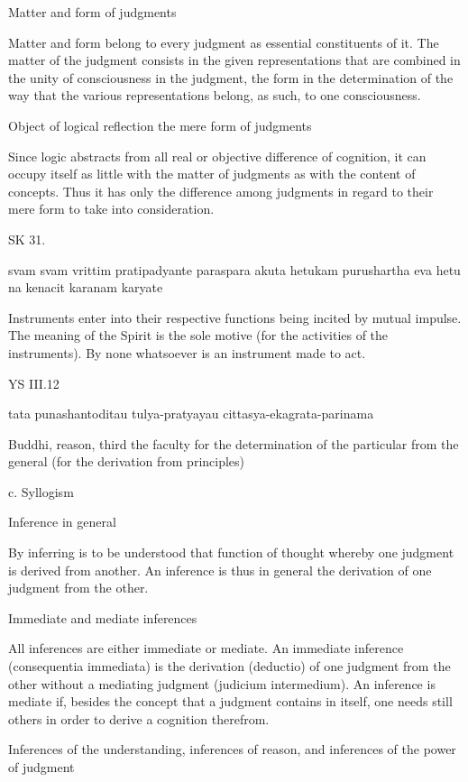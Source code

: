    Matter and form of judgments

        Matter and form belong to every judgment as essential constituents of it.
        The matter of the judgment consists in the given representations that are combined in
        the unity of consciousness in the judgment,
        the form in the determination of the way that the various representations belong, as such,
        to one consciousness.

    Object of logical reflection the mere form of judgments

        Since logic abstracts from all real or objective difference of cognition,
        it can occupy itself as little with the matter of judgments
        as with the content of concepts.
        Thus it has only the difference among judgments in regard to their mere form
        to take into consideration.

SK 31.

svam svam vrittim pratipadyante paraspara akuta hetukam
purushartha eva hetu na kenacit karanam karyate

Instruments enter into their respective functions being incited by mutual impulse.
The meaning of the Spirit is the sole motive (for the activities of the instruments).
By none whatsoever is an instrument made to act.

YS III.12

    tata punashantoditau tulya-pratyayau cittasya-ekagrata-parinama

    Buddhi, reason, third the faculty for the determination of
    the particular from the general (for the derivation from principles)

    c. Syllogism

    Inference in general

        By inferring is to be understood that function of thought whereby one judgment is derived from another.
        An inference is thus in general the derivation of one judgment from the other.

    Immediate and mediate inferences

        All inferences are either immediate or mediate.
        An immediate inference (consequentia immediata) is the derivation (deductio) of
        one judgment from the other without a mediating judgment (judicium intermedium).
        An inference is mediate if, besides the concept that a judgment contains in itself,
        one needs still others in order to derive a cognition therefrom.

    Inferences of the understanding, inferences of reason,
    and inferences of the power of judgment

